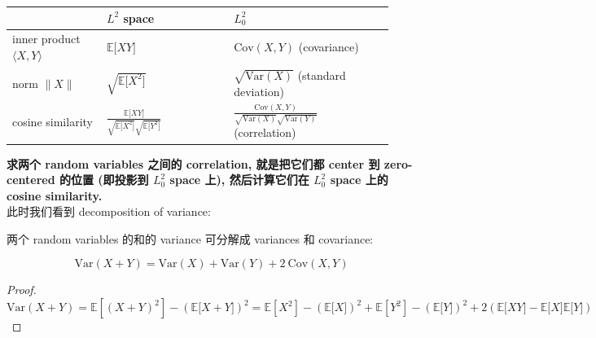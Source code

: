 {\def\LTcaptype{none} %
\small\setlength{\tabcolsep}{4pt}\renewcommand{\arraystretch}{1.3}
\begin{longtable}[]{@{}p{0.23\linewidth}p{0.31\linewidth}p{0.39\linewidth}@{}}
\toprule\noalign{}
& \textbf{\(\mathit{L}^{2}\) space} & \textbf{\(\mathit{L}_{0}^{2}\)} \\
\midrule\noalign{}
\endhead
\bottomrule\noalign{}
\endlastfoot
inner product \(\langle\mathit{X},\mathit{Y}\rangle\) & \(\mathbb{E}\lbrack\mathit{X}\mathit{Y}\rbrack\) & \(\text{Cov}(\mathit{X},\mathit{Y})\) (covariance) \\
norm \(\parallel \mathit{X} \parallel\) & \(\sqrt{\mathbb{E}\lbrack\mathit{X}^{2}\rbrack}\) & \(\sqrt{\text{Var}(\mathit{X})}\) (standard deviation) \\
cosine similarity & \(\frac{\mathbb{E}\lbrack\mathit{X}\mathit{Y}\rbrack}{\sqrt{\mathbb{E}\lbrack\mathit{X}^{2}\rbrack}\sqrt{\mathbb{E}\lbrack\mathit{Y}^{2}\rbrack}}\) & \(\frac{\text{Cov}(\mathit{X},\mathit{Y})}{\sqrt{\text{Var}(\mathit{X})}\sqrt{\text{Var}(\mathit{Y})}}\) (correlation) \\
\end{longtable}
}

\textbf{求两个 random variables 之间的 correlation, 就是把它们都 center 到 zero-centered 的位置 (即投影到 \(\mathit{L}_{0}^{2}\) space 上), 然后计算它们在 \(\mathit{L}_{0}^{2}\) space 上的 cosine similarity.}\\
此时我们看到 decomposition of variance:

\begin{proposition}{}

两个 random variables 的和的 variance 可分解成 variances 和 covariance:

\[\text{Var}(\mathit{X} + \mathit{Y}) = \text{Var}(\mathit{X}) + \text{Var}(\mathit{Y}) + 2\ \text{Cov}(\mathit{X},\mathit{Y})\]

\end{proposition}

\begin{proof}

\[\text{Var}(\mathit{X} + \mathit{Y}) = \mathbb{E}\left\lbrack {(\mathit{X} + \mathit{Y})^{2}} \right\rbrack - (\mathbb{E}\lbrack\mathit{X} + \mathit{Y}\rbrack)^{2} = \mathbb{E}\left\lbrack \mathit{X}^{2} \right\rbrack - (\mathbb{E}\lbrack\mathit{X}\rbrack)^{2} + \mathbb{E}\left\lbrack \mathit{Y}^{2} \right\rbrack - (\mathbb{E}\lbrack\mathit{Y}\rbrack)^{2} + 2(\mathbb{E}\lbrack\mathit{X}\mathit{Y}\rbrack - \mathbb{E}\lbrack\mathit{X}\rbrack\mathbb{E}\lbrack\mathit{Y}\rbrack)\]

\end{proof}

